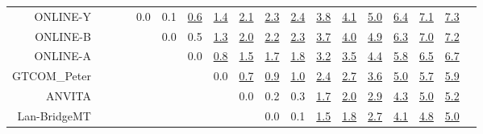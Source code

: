 \documentclass[11pt]{article}
\begin{document}
\begin{sidewaystable}
\begin{center}
{\begin{tabular}{rccccccccccccccccc}
ONLINE-Y &    &  &  & \cellcolor{red!0} 0.0 & \cellcolor{red!0} 0.1 & \cellcolor{red!70} \underline{0.6} & \cellcolor{red!70} \underline{1.4} & \cellcolor{red!70} \underline{2.1} & \cellcolor{red!70} \underline{2.3} & \cellcolor{red!70} \underline{2.4} & \cellcolor{red!70} \underline{3.8} & \cellcolor{red!70} \underline{4.1} & \cellcolor{red!70} \underline{5.0} & \cellcolor{red!70} \underline{6.4} & \cellcolor{red!70} \underline{7.1} & \cellcolor{red!70} \underline{7.3}\\ 
ONLINE-B &    &  &  &  & \cellcolor{red!0} 0.0 & \cellcolor{red!70} 0.5 & \cellcolor{red!70} \underline{1.3} & \cellcolor{red!70} \underline{2.0} & \cellcolor{red!70} \underline{2.2} & \cellcolor{red!70} \underline{2.3} & \cellcolor{red!70} \underline{3.7} & \cellcolor{red!70} \underline{4.0} & \cellcolor{red!70} \underline{4.9} & \cellcolor{red!70} \underline{6.3} & \cellcolor{red!70} \underline{7.0} & \cellcolor{red!70} \underline{7.2}\\ 
ONLINE-A &    &  &  &  &  & \cellcolor{red!0} 0.0 & \cellcolor{red!70} \underline{0.8} & \cellcolor{red!70} \underline{1.5} & \cellcolor{red!70} \underline{1.7} & \cellcolor{red!70} \underline{1.8} & \cellcolor{red!70} \underline{3.2} & \cellcolor{red!70} \underline{3.5} & \cellcolor{red!70} \underline{4.4} & \cellcolor{red!70} \underline{5.8} & \cellcolor{red!70} \underline{6.5} & \cellcolor{red!70} \underline{6.7}\\ 
GTCOM\_Peter &    &  &  &  &  &  & \cellcolor{red!0} 0.0 & \cellcolor{red!70} \underline{0.7} & \cellcolor{red!70} \underline{0.9} & \cellcolor{red!70} \underline{1.0} & \cellcolor{red!70} \underline{2.4} & \cellcolor{red!70} \underline{2.7} & \cellcolor{red!70} \underline{3.6} & \cellcolor{red!70} \underline{5.0} & \cellcolor{red!70} \underline{5.7} & \cellcolor{red!70} \underline{5.9}\\ 
ANVITA &    &  &  &  &  &  &  & \cellcolor{red!0} 0.0 & \cellcolor{red!0} 0.2 & \cellcolor{red!10} 0.3 & \cellcolor{red!70} \underline{1.7} & \cellcolor{red!70} \underline{2.0} & \cellcolor{red!70} \underline{2.9} & \cellcolor{red!70} \underline{4.3} & \cellcolor{red!70} \underline{5.0} & \cellcolor{red!70} \underline{5.2}\\ 
Lan-BridgeMT &    &  &  &  &  &  &  &  & \cellcolor{red!0} 0.0 & \cellcolor{red!0} 0.1 & \cellcolor{red!70} \underline{1.5} & \cellcolor{red!70} \underline{1.8} & \cellcolor{red!70} \underline{2.7} & \cellcolor{red!70} \underline{4.1} & \cellcolor{red!70} \underline{4.8} & \cellcolor{red!70} \underline{5.0}\\ 

\end{tabular}}
\end{center}
\end{sidewaystable}
\end{document}
